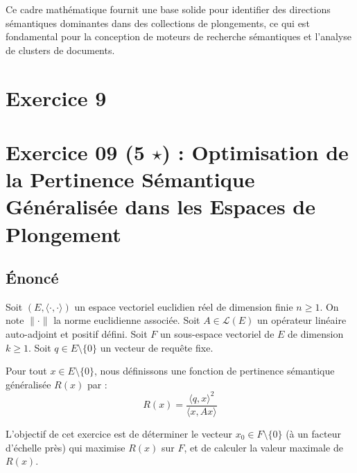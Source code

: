 \documentclass[11pt,a4paper]{report}
\begin{document}
Ce cadre mathématique fournit une base solide pour identifier des
directions sémantiques dominantes dans des collections de plongements,
ce qui est fondamental pour la conception de moteurs de recherche
sémantiques et l'analyse de clusters de documents.


\section*{Exercice 9}
\hypertarget{exercice-09-5-star-optimisation-de-la-pertinence-suxe9mantique-guxe9nuxe9ralisuxe9e-dans-les-espaces-de-plongement}{%
\section{\texorpdfstring{Exercice 09 (5 \(\star\)) : Optimisation de la
Pertinence Sémantique Généralisée dans les Espaces de
Plongement}{Exercice 09 (5 \textbackslash star) : Optimisation de la Pertinence Sémantique Généralisée dans les Espaces de Plongement}}\label{exercice-09-5-star-optimisation-de-la-pertinence-suxe9mantique-guxe9nuxe9ralisuxe9e-dans-les-espaces-de-plongement}}

\hypertarget{uxe9noncuxe9}{%
\subsection{Énoncé}\label{uxe9noncuxe9}}

Soit \((E, \langle \cdot, \cdot \rangle)\) un espace vectoriel euclidien
réel de dimension finie \(n \ge 1\). On note \(\|\cdot\|\) la norme
euclidienne associée. Soit \(A \in \mathcal{L}(E)\) un opérateur
linéaire auto-adjoint et positif défini. Soit \(F\) un sous-espace
vectoriel de \(E\) de dimension \(k \ge 1\). Soit
\(q \in E \setminus \{0\}\) un vecteur de requête fixe.

Pour tout \(x \in E \setminus \{0\}\), nous définissons une fonction de
pertinence sémantique généralisée \(R(x)\) par :
\[R(x) = \frac{\langle q, x \rangle^2}{\langle x, Ax \rangle}\]

L'objectif de cet exercice est de déterminer le vecteur
\(x_0 \in F \setminus \{0\}\) (à un facteur d'échelle près) qui maximise
\(R(x)\) sur \(F\), et de calculer la valeur maximale de \(R(x)\).
\end{document}

